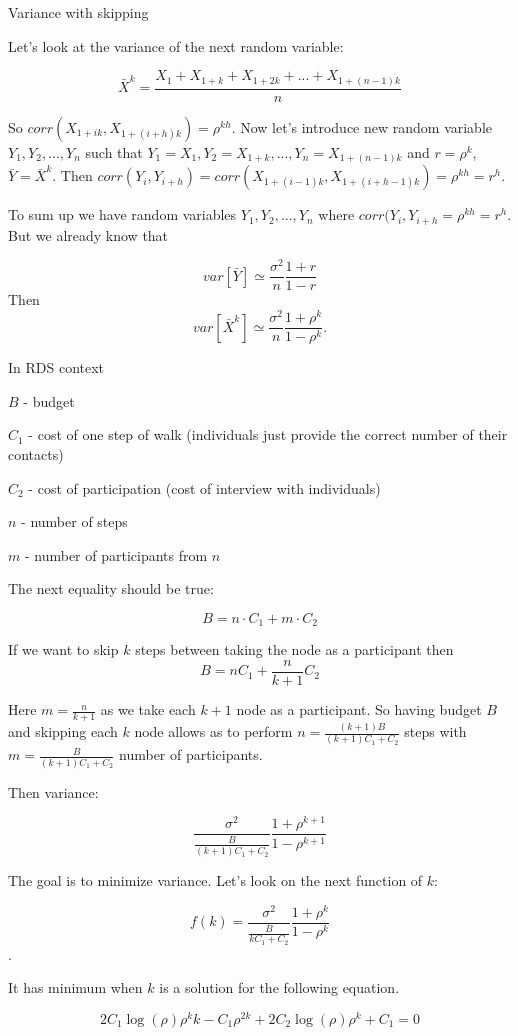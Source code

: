 \documentclass[12pt]{report}
\begin{document}
Variance with skipping

Let's look at the variance of the next random variable:

$$\bar{X}^k = \frac{X_1 + X_{1+k} + X_{1+2k} + ... + X_{1 + (n-1)k}}{n}$$

So $corr(X_{1 + ik}, X_{1 + (i+h)k}) = \rho^{kh}$. 
Now let's introduce new random variable $Y_1, Y_2, ..., Y_n$ such that $Y_1 = X_1, Y_2 = X_{1+k}, ..., Y_n = X_{1 + (n-1)k}$ and $r = \rho^k$, $\bar{Y}= \bar{X}^k$. Then $corr(Y_i, Y_{i+h}) = corr(X_{1 + (i-1)k}, X_{1 + (i+h-1)k}) = \rho^{kh} = r^h$.

To sum up we have random variables $Y_1, Y_2, ..., Y_n$ where $corr(Y_i, Y_{i+h} = \rho^{kh} = r^h$. But we already know that 

$$var\left[\bar{Y} \right] \simeq  \frac{\sigma^2}{n} \frac{1+r}{1-r}$$
Then
$$var\left[\bar{X}^k \right] \simeq  \frac{\sigma^2}{n} \frac{1+\rho^k}{1-\rho^k}.$$


In RDS context

$B$ - budget

$C_1$ - cost of one step of walk (individuals just provide the correct number of their contacts)

$C_2$ - cost of participation (cost of interview with individuals)

$n$ - number of steps

$m$ - number of participants from $n$

The next equality should be true:

$$B = n \cdot C_1 + m \cdot C_2$$

If we want to skip $k$ steps between taking the node as a participant then
$$B = nC_1 + \frac{n}{k+1}C_2$$

Here $m = \frac{n}{k+1}$ as we take each $k+1$ node as a participant. So having budget $B$ and skipping each $k$ node allows as to perform $n = \frac{(k+1)B}{(k+1)C_1 + C_2}$ steps with $m = \frac{B}{(k+1)C_1 + C_2}$ number of participants.

Then variance:

$$\frac{\sigma^2}{\frac{B}{(k+1)C_1 + C_2}} \frac{1+\rho^{k+1}}{1-\rho^{k+1}}$$ 

The goal is to minimize variance. Let's look on the next function of $k$:

$$ f(k) = \frac{\sigma^2}{\frac{B}{kC_1 + C_2}} \frac{1+\rho^{k}}{1-\rho^{k}}$$.

It has minimum when $k$ is a solution for the following equation.

$$ 2C_1 \log(\rho) \rho^kk - C_1\rho^{2k} + 2C_2 \log(\rho) \rho^k + C_1 = 0$$
\end{document}
